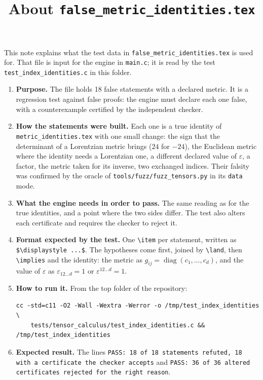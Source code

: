 \documentclass[11pt,a4paper]{article}
\title{About \texttt{false\_metric\_identities.tex}}
\author{}
\date{}
\begin{document}
\maketitle
This note explains what the test data in \texttt{false\_metric\_identities.tex} is used for. That file is input for the engine in \texttt{main.c}; it is read by the test \texttt{test\_index\_identities.c} in this folder.

\begin{enumerate}
\item \textbf{Purpose.} The file holds 18 false statements with a declared metric. It is a regression test against false proofs: the engine must declare each one false, with a counterexample certified by the independent checker.

\item \textbf{How the statements were built.} Each one is a true identity of \texttt{metric\_identities.tex} with one small change: the sign that the determinant of a Lorentzian metric brings ($24$ for $-24$), the Euclidean metric where the identity needs a Lorentzian one, a different declared value of $\varepsilon$, a factor, the metric taken for its inverse, two exchanged indices. Their falsity was confirmed by the oracle of \texttt{tools/fuzz/fuzz\_tensors.py} in its \texttt{data} mode.

\item \textbf{What the engine needs in order to pass.} The same reading as for the true identities, and a point where the two sides differ. The test also alters each certificate and requires the checker to reject it.

\item \textbf{Format expected by the test.} One \texttt{\textbackslash item} per statement, written as \texttt{\$\textbackslash displaystyle ...\$}. The hypotheses come first, joined by \texttt{\textbackslash land}, then \texttt{\textbackslash implies} and the identity: the metric as $g_{ij} = \operatorname{diag}(c_1, \dots, c_d)$, and the value of $\varepsilon$ as $\varepsilon_{12 \dots d} = 1$ or $\varepsilon^{12 \dots d} = 1$.

\item \textbf{How to run it.} From the top folder of the repository:
\begin{verbatim}
cc -std=c11 -O2 -Wall -Wextra -Werror -o /tmp/test_index_identities \
    tests/tensor_calculus/test_index_identities.c && /tmp/test_index_identities
\end{verbatim}

\item \textbf{Expected result.} The lines \texttt{PASS: 18 of 18 statements refuted, 18 with a certificate the checker accepts} and \texttt{PASS: 36 of 36 altered certificates rejected for the right reason}.
\end{enumerate}
\end{document}
